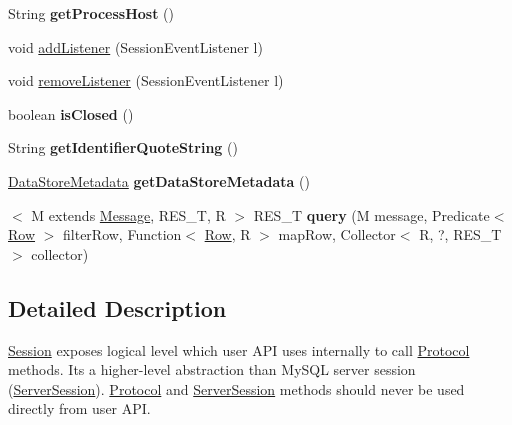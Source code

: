 \begin{DoxyCompactItemize}
String {\bfseries get\+Process\+Host} ()
\item 
void \mbox{\hyperlink{interfacecom_1_1mysql_1_1cj_1_1_session_a10e70a1ef528b3a067cd682cc5eddfb9}{add\+Listener}} (Session\+Event\+Listener l)
\item 
void \mbox{\hyperlink{interfacecom_1_1mysql_1_1cj_1_1_session_a1adcdda54ca553c5449119570e072c7a}{remove\+Listener}} (Session\+Event\+Listener l)
\item 
\mbox{\label{interfacecom_1_1mysql_1_1cj_1_1_session_a82714d0d3979d474bcafd3884f3ea0de}} 
boolean {\bfseries is\+Closed} ()
\item 
\mbox{\label{interfacecom_1_1mysql_1_1cj_1_1_session_a5e11ee96316b575dcdf04270c90cc783}} 
String {\bfseries get\+Identifier\+Quote\+String} ()
\item 
\mbox{\label{interfacecom_1_1mysql_1_1cj_1_1_session_a863ee0712226bd70718bcc1f812c592d}} 
\mbox{\hyperlink{interfacecom_1_1mysql_1_1cj_1_1_data_store_metadata}{Data\+Store\+Metadata}} {\bfseries get\+Data\+Store\+Metadata} ()
\item 
\mbox{\label{interfacecom_1_1mysql_1_1cj_1_1_session_aa427397e1aec0d100dcfbdbf8aba74bd}} 
$<$ M extends \mbox{\hyperlink{interfacecom_1_1mysql_1_1cj_1_1protocol_1_1_message}{Message}}, R\+E\+S\+\_\+T, R $>$ R\+E\+S\+\_\+T {\bfseries query} (M message, Predicate$<$ \mbox{\hyperlink{interfacecom_1_1mysql_1_1cj_1_1result_1_1_row}{Row}} $>$ filter\+Row, Function$<$ \mbox{\hyperlink{interfacecom_1_1mysql_1_1cj_1_1result_1_1_row}{Row}}, R $>$ map\+Row, Collector$<$ R, ?, R\+E\+S\+\_\+T $>$ collector)
\end{DoxyCompactItemize}


\subsection{Detailed Description}
\mbox{\hyperlink{interfacecom_1_1mysql_1_1cj_1_1_session}{Session}} exposes logical level which user A\+PI uses internally to call \mbox{\hyperlink{}{Protocol}} methods. It\textquotesingle{}s a higher-\/level abstraction than My\+S\+QL server session (\mbox{\hyperlink{}{Server\+Session}}). \mbox{\hyperlink{}{Protocol}} and \mbox{\hyperlink{}{Server\+Session}} methods should never be used directly from user A\+PI. 

